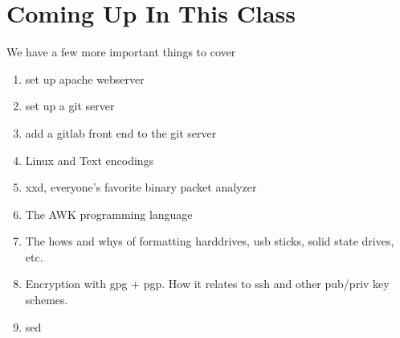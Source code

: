 \documentclass[10pt]{article}
\begin{document}
\section{Coming Up In This Class}

We have a few more important things to cover
\begin{enumerate}
\item set up apache webserver
\item set up a git server
\item add a gitlab front end to the git server
\item Linux and Text encodings
\item xxd, everyone's favorite binary packet analyzer
\item The AWK programming language
\item The hows and whys of formatting harddrives, usb sticks, solid state drives, etc.
\item Encryption with gpg + pgp. How it relates to ssh and other pub/priv key schemes.
\item sed
\end{enumerate}
\end{document}
